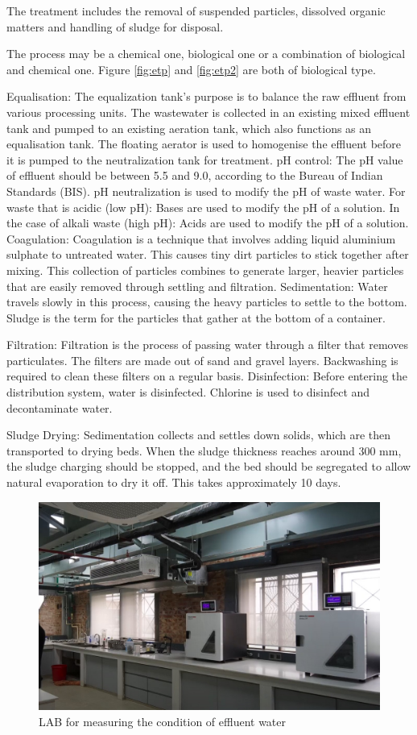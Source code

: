 The treatment includes the removal of suspended particles, dissolved organic matters and handling of sludge for disposal.

The process may be a chemical one, biological one or a combination of biological and chemical one. Figure \ref{fig:etp} and \ref{fig:etp2} are both of biological type.

Equalisation: The equalization tank's purpose is to balance the raw effluent from various processing units. The wastewater is collected in an existing mixed effluent tank and pumped to an existing aeration tank, which also functions as an equalisation tank. The floating aerator is used to homogenise the effluent before it is pumped to the neutralization tank for treatment.
pH control: The pH value of effluent should be between 5.5 and 9.0, according to the Bureau of Indian Standards (BIS). pH neutralization is used to modify the pH of waste water.
For waste that is acidic (low pH): Bases are used to modify the pH of a solution.
In the case of alkali waste (high pH): Acids are used to modify the pH of a solution.
Coagulation: Coagulation is a technique that involves adding liquid aluminium sulphate to untreated water. This causes tiny dirt particles to stick together after mixing. This collection of particles combines to generate larger, heavier particles that are easily removed through settling and filtration.
Sedimentation: Water travels slowly in this process, causing the heavy particles to settle to the bottom. Sludge is the term for the particles that gather at the bottom of a container.

Filtration: Filtration is the process of passing water through a filter that removes particulates. The filters are made out of sand and gravel layers. Backwashing is required to clean these filters on a regular basis.
Disinfection: Before entering the distribution system, water is disinfected. Chlorine is used to disinfect and decontaminate water.

Sludge Drying: Sedimentation collects and settles down solids, which are then transported to drying beds. When the sludge thickness reaches around 300 mm, the sludge charging should be stopped, and the bed should be segregated to allow natural evaporation to dry it off. This takes approximately 10 days.

\begin{figure}[h!]
    \centering
    \includegraphics[width=0.8\linewidth]{figs/lab.jpg}
    \caption{LAB for measuring the condition of effluent water}
    \label{fig:LAB}
\end{figure}